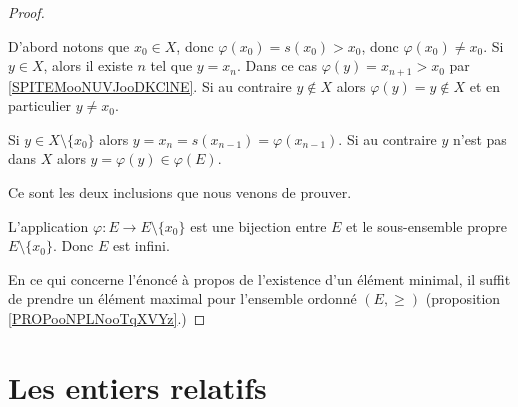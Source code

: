 \begin{proof}
\begin{subproof}
		D'abord notons que \( x_0\in X\), donc \( \varphi(x_0)=s(x_0)>x_0\), donc \( \varphi(x_0)\neq x_0\). Si \( y\in X\), alors il existe \( n\) tel que \( y=x_n\). Dans ce cas \( \varphi(y)=x_{n+1}>x_0\) par \ref{SPITEMooNUVJooDKClNE}. Si au contraire \( y\not\in X\) alors \( \varphi(y)=y\not\in X\) et en particulier \( y\neq x_0\).

		Si \( y\in X\setminus\{ x_0 \}\) alors \( y=x_n=s(x_{n-1})=\varphi(x_{n-1})\). Si au contraire \( y\) n'est pas dans \( X\) alors \( y=\varphi(y)\in \varphi(E)\).

		\spitem[\( E\setminus\{ x_0 \}=\varphi(E)\)]
		Ce sont les deux inclusions que nous venons de prouver.

		\spitem[Conclusion]
		L'application \(\varphi \colon E\to E\setminus\{ x_0 \}  \) est une bijection entre \( E\) et le sous-ensemble propre \( E\setminus\{ x_0 \}\). Donc \( E\) est infini.
	\end{subproof}

	En ce qui concerne l'énoncé à propos de l'existence d'un élément minimal, il suffit de prendre un élément maximal pour l'ensemble ordonné \( (E,\geq)\) (proposition \ref{PROPooNPLNooTqXVYz}.)
\end{proof}



\section{Les entiers relatifs}
\label{SECooNombresEntiers}

